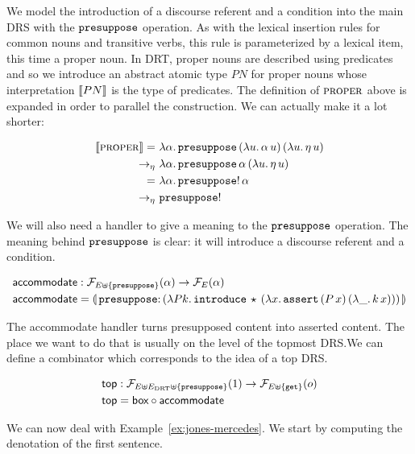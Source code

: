 \vspace{6mm}

We model the introduction of a discourse referent and a condition into the
main DRS with the $\mathtt{presuppose}$ operation. As with the lexical
insertion rules for common nouns and transitive verbs, this rule is
parameterized by a lexical item, this time a proper noun. In DRT, proper
nouns are described using predicates and so we introduce an abstract atomic
type $PN$ for proper nouns whose interpretation $\llbracket PN \rrbracket$ is the type of
predicates. The definition of $\textsc{proper}$ above is expanded in order to
parallel the construction. We can actually make it a lot shorter:

\begin{align*}
  \sem{\abs{proper}}
  =\ &\lam{\alpha}{\app{\op{presuppose}}{(\lam{u}{\ap{\alpha}{u}})}{(\lam{u}{\ap{\eta}{u}})}} \\
  \to_\eta\ &\lam{\alpha}{\app{\op{presuppose}}{\alpha}{(\lam{u}{\ap{\eta}{u}})}} \\
  =\ &\lam{\alpha}{\ap{\op{presuppose}!}{\alpha}} \\
  \to_\eta\ &\op{presuppose}!
\end{align*}

We will also need a handler to give a meaning to the $\mathtt{presuppose}$
operation. The meaning behind $\mathtt{presuppose}$ is clear: it will introduce
a discourse referent and a condition.

\begin{align*}
  \accommodate &: \FF_{E \uplus \{\op{presuppose}\}}(\alpha) \to \FF_E(\alpha) \\
  \accommodate &= \banana{\onto{\op{presuppose}}{(\lam{P k}{\app{\op{introduce}}{\star}{(\lam{x}{\app{\op{assert}}{(\ap{P}{x})}{(\lam{\_}{\ap{k}{x}})}})}})}}
\end{align*}

The accommodate handler turns presupposed content into asserted
content. The place we want to do that is usually on the level of the
topmost DRS.\@ We can define a combinator which corresponds to the idea of
a top DRS.

\begin{align*}
  \textsf{top} &: \mathcal{F}_{E \uplus E_{\mathrm{DRT}} \uplus \{\mathtt{presuppose}\}}(1) \to \mathcal{F}_{E \uplus \{\mathtt{get}\}}(o) \\
  \textsf{top} &= \textsf{box} \circ \textsf{accommodate}
\end{align*}

We can now deal with Example~\ref{ex:jones-mercedes}. We start by computing
the denotation of the first sentence.

